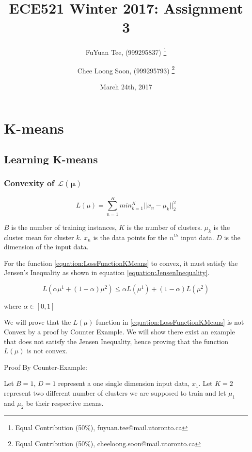 \documentclass[a4paper,12pt]{article}
\title{ECE521 Winter 2017: Assignment 3}
\author{FuYuan Tee, (999295837)
  \thanks{Equal Contribution (50\%), fuyuan.tee@mail.utoronto.ca}
\and Chee Loong Soon, (999295793) \thanks{Equal Contribution (50\%),  cheeloong.soon@mail.utoronto.ca}}
\date{March 24th, 2017}
\begin{document}
\maketitle
\tableofcontents
\clearpage

\section{K-means}
\subsection{Learning K-means}
\subsubsection{Convexity of $\mathcal{L}(\mathbf{\mu})$}


\begin{equation}
\label{equation:LossFunctionKMeans}
L(\mu) = \sum_{n=1}^{B} min_{k=1}^{K} ||x_{n} - \mu_{k} ||_{2}^{2}
\end{equation}

$B$ is the number of training instances, $K$ is the number of clusters. $\mu_{k}$ is the cluster mean for cluster $k$. $x_{n}$ is the data points for the $n^{th}$ input data. $D$ is the dimension of the input data. 

For the function \ref{equation:LossFunctionKMeans} to convex, it must satisfy the Jensen's Inequality as shown in equation \ref{equation:JensenInequality}. 

\begin{equation}
\label{equation:JensenInequality}
L(\alpha \mu^{1} + (1-\alpha)\mu^{2}) \leq \alpha L(\mu^{1}) + (1-\alpha)L(\mu^{2})
\end{equation}

where $\alpha \in [0, 1]$

We will prove that the $L(\mu)$ function in \ref{equation:LossFunctionKMeans} is not Convex by a proof by Counter Example. We will show there exist an example that does not satisfy the Jensen Inequality, hence proving that the function $L(\mu)$ is not convex. 

Proof By Counter-Example:

Let $B = 1$, $D = 1$ represent a one single dimension input data, $x_{1}$. Let $K = 2$ represent two different number of clusters we are supposed to train and let $\mu_{1}$ and $\mu_{2}$ be their respective means. 
\end{document}
